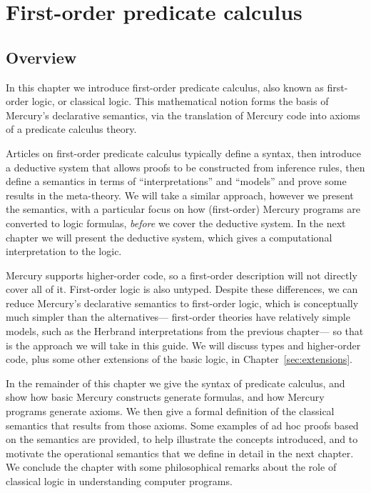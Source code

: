 \chapter{First-order predicate calculus}
\label{sec:fopc}

\section{Overview}

In this chapter we introduce first-order predicate calculus,
also known as first-order logic, or classical logic.
This mathematical notion
forms the basis of Mercury's declarative semantics,
via the translation of Mercury code
into axioms of a predicate calculus theory.

Articles on first-order predicate calculus
typically define a syntax,
then introduce a deductive system that allows proofs to be constructed
from inference rules,
then define a semantics in terms of ``interpretations'' and ``models''
and prove some results in the meta-theory.
We will take a similar approach,
however we present the semantics,
with a particular focus on how (first-order) Mercury programs
are converted to logic formulas,
\emph{before} we cover the deductive system.
In the next chapter we will present the deductive system,
which gives a computational interpretation to the logic.

Mercury supports higher-order code,
so a first-order description will not directly cover all of it.
First-order logic is also untyped.
Despite these differences,
we can reduce Mercury's declarative semantics to first-order logic,
which is conceptually much simpler than the alternatives---%
first-order theories have relatively simple models,
such as the Herbrand interpretations from the previous chapter---%
so that is the approach we will take in this guide.
We will discuss types and higher-order code,
plus some other extensions of the basic logic,
in Chapter~\ref{sec:extensions}.

In the remainder of this chapter
we give the syntax of predicate calculus,
and show how basic Mercury constructs generate formulas,
and how Mercury programs generate axioms.
We then give a formal definition of the classical semantics
that results from those axioms.
Some examples of ad hoc proofs based on the semantics are provided,
to help illustrate the concepts introduced,
and to motivate the operational semantics
that we define in detail in the next chapter.
We conclude the chapter with some philosophical remarks about
the role of classical logic in understanding computer programs.


